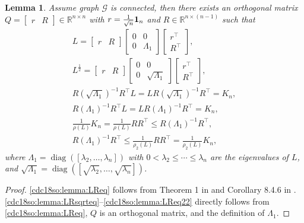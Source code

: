 \documentclass[letterpaper, 10 pt, conference]{ieeeconf}  %
\newtheorem{lemma}{Lemma}
\DeclareMathOperator{\diag}{diag}
\begin{document}
\begin{lemma}\label{cdc18so:lemma:LR}
Assume graph $\mathcal G$ is connected, then there exists an orthogonal matrix $Q=\left[\begin{array}{ll}r&R
\end{array}\right]\in\mathbb{R}^{n\times n}$ with $r=\frac{1}{\sqrt{n}}{\bf 1}_n$ and $R\in\mathbb{R}^{n\times (n-1)}$ such that
\begin{align}
L=\left[\begin{array}{ll}r&R
\end{array}\right]\left[\begin{array}{ll}0&0\\
0&\Lambda_1
\end{array}\right]\left[\begin{array}{l}r^\top\\
R^\top
\end{array}\right],\label{cdc18so:lemma:LReq}\\
L^{\frac{1}{2}}=\left[\begin{array}{ll}r&R
\end{array}\right]\left[\begin{array}{ll}0&0\\
0&\sqrt{\Lambda_1}
\end{array}\right]\left[\begin{array}{l}r^\top\\
R^\top
\end{array}\right],\label{cdc18so:lemma:LRsqrteq}\\
R(\sqrt{\Lambda_1})^{-1}R^\top L=LR(\sqrt{\Lambda_1})^{-1}R^\top=K_n,\label{cdc18so:lemma:LReq2}\\
R(\Lambda_1)^{-1}R^\top L=LR(\Lambda_1)^{-1}R^\top=K_n,\label{cdc18so:lemma:LRsqrteq2}\\
\frac{1}{\rho(L)}K_n=\frac{1}{\rho(L)} RR^\top\le R(\Lambda_1)^{-1}R^\top,\label{cdc18so:lemma:LReq21}\\
R(\Lambda_1)^{-1}R^\top \le\frac{1}{\rho_2(L)} RR^\top= \frac{1}{\rho_2(L)}K_n,\label{cdc18so:lemma:LReq22}
\end{align}
where $\Lambda_1=\diag([\lambda_2,\dots,\lambda_n])$ with $0<\lambda_2\le\cdots\le\lambda_n$ are the eigenvalues of $L$, and $\sqrt{\Lambda_1}=\diag([\sqrt{\lambda_2},\dots,\sqrt{\lambda_n}])$.
\end{lemma}
\begin{proof}
\eqref{cdc18so:lemma:LReq} follows from Theorem 1 in \cite{olfati2004consensus} and Corollary 8.4.6 in \cite{godsil2013algebraic}. \eqref{cdc18so:lemma:LRsqrteq}--\eqref{cdc18so:lemma:LReq22} directly follows from \eqref{cdc18so:lemma:LReq}, $Q$ is an orthogonal matrix, and the definition of $\Lambda_1$.
\end{proof}
\end{document}
